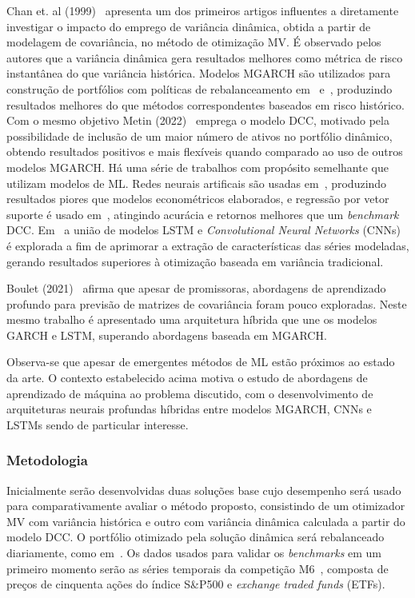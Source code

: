 \documentclass[a4paper, 12pt]{article}
\begin{document}
\begin{spacing}{.9}
Chan et. al (1999)~\cite{chan1999portfolio} apresenta um dos primeiros artigos
influentes a diretamente investigar o impacto do emprego de variância dinâmica,
obtida a partir de modelagem de covariância, no método de otimização MV. É
observado pelos autores que a variância dinâmica gera resultados melhores como
métrica de risco instantânea do que variância histórica. Modelos MGARCH são
utilizados para construção de portfólios com políticas de rebalanceamento
em~\cite{holten} e~\cite{weirum}, produzindo resultados melhores do que métodos
correspondentes baseados em risco histórico. Com o mesmo objetivo Metin
(2022)~\cite{metin} emprega o modelo DCC, motivado pela possibilidade de
inclusão de um maior número de ativos no portfólio dinâmico, obtendo resultados
positivos e mais flexíveis quando comparado ao uso de outros modelos MGARCH. Há
uma série de trabalhos com propósito semelhante que utilizam modelos de ML.
Redes neurais artificais são usadas em~\cite{ann}, produzindo resultados piores
que modelos econométricos elaborados, e regressão por vetor suporte é usado
em~\cite{svr}, atingindo acurácia e retornos melhores que um \emph{benchmark}
DCC. Em~\cite{dl2} a união de modelos LSTM e \emph{Convolutional Neural
Networks} (CNNs)~\cite{cnn} é explorada a fim de aprimorar a extração de características
das séries modeladas, gerando resultados superiores à otimização baseada em
variância tradicional.

Boulet (2021)~\cite{dl_multi} afirma que apesar de promissoras, abordagens de
aprendizado profundo para previsão de matrizes de covariância foram pouco
exploradas. Neste mesmo trabalho é apresentado uma arquitetura híbrida que une
os modelos GARCH e LSTM, superando abordagens baseada em MGARCH.

Observa-se que apesar de emergentes métodos de ML estão próximos ao estado da
arte. O contexto estabelecido acima motiva o estudo de abordagens de
aprendizado de máquina ao problema discutido, com o desenvolvimento de
arquiteturas neurais profundas híbridas entre modelos MGARCH, CNNs e LSTMs
sendo de particular interesse.

\subsubsection*{Metodologia}

Inicialmente serão desenvolvidas duas soluções base cujo desempenho será usado
para comparativamente avaliar o método proposto, consistindo de um otimizador
MV com variância histórica e outro com variância dinâmica calculada a partir do
modelo DCC. O portfólio otimizado pela solução dinâmica será rebalanceado
diariamente, como em~\cite{metin}. Os dados usados para validar os
\emph{benchmarks} em um primeiro momento serão as séries temporais da
competição M6~\cite{m6}, composta de preços de cinquenta ações do índice
S\&P500 e \emph{exchange traded funds} (ETFs).


\end{spacing}
\end{document}
